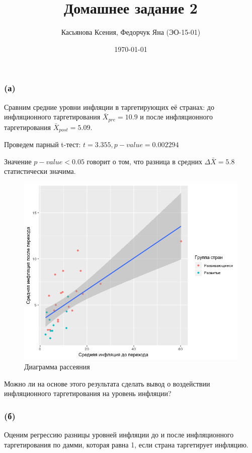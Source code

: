 \documentclass[a4paper,12pt]{article} %
\author{Касьянова Ксения, Федорчук Яна (ЭО-15-01) }
\title{Домашнее задание 2}
\date{\today}
\begin{document}
\maketitle

\subsubsection*{(а)}	

Сравним средние уровни инфляции в таргетирующих её странах:  до инфляционного таргетирования $ \bar{X}_{pre} = 10.9 $ и после инфляционного таргетирования $ \bar{X}_{post} = 5.09$. 

Проведем парный t-тест: $ t = 3.355, p-value = 0.002294$

Значение $ p-value < 0.05 $ говорит о том, что разница в средних $ \Delta \bar{X} = 5.8 $  статистически значима.    
	
\begin{figure}[h!]
	\centering
	\includegraphics[width=0.7\linewidth]{Rplot}
	\caption[Диаграмма рассеяния]{Диаграмма рассеяния}
	\label{fig:rplot1}
\end{figure}


Можно ли на основе
этого результата сделать вывод о воздействии инфляционного
таргетирования на уровень инфляции?




	
	
\subsubsection*{(б)}	

Оценим регрессию разницы уровней инфляции до и после инфляционного таргетирования по дамми, которая равна 1, если страна таргетирует инфляцию.

\newpage
\end{document}
